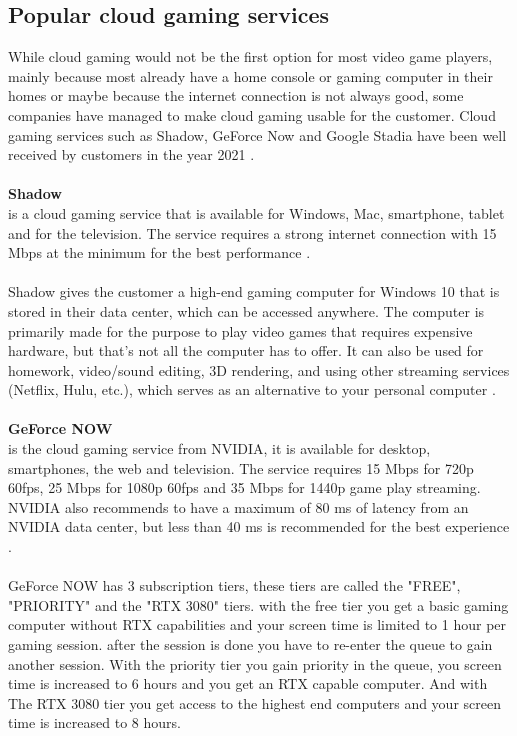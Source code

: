 \subsection{Popular cloud gaming services}
While cloud gaming would not be the first option for most video game players, mainly because most already have a home console or gaming computer in their homes or maybe because the internet connection is not always good, some companies have managed to make cloud gaming usable for the customer. Cloud gaming services such as Shadow, GeForce Now and Google Stadia have been well received by customers in the year 2021 \parencite{topcloud}.\\\\
\textbf{Shadow}\\
 is a cloud gaming service that is available for Windows, Mac, smartphone, tablet and for the television. The service requires a strong internet connection with 15 Mbps at the minimum for the best performance \parencite{shadow}.\\\\
Shadow gives the customer a high-end gaming computer for Windows 10 that is stored in their data center, which can be accessed anywhere. The computer is primarily made for the purpose to play video games that requires expensive hardware, but that's not all the computer has to offer. It can also be used for homework, video/sound editing, 3D rendering, and using other streaming services (Netflix, Hulu, etc.), which serves as an alternative to your personal computer \parencite{shadow}.\\\\
\textbf{GeForce NOW}\\
 is the cloud gaming service from NVIDIA, it is available for desktop, smartphones, the web and television. The service requires 15 Mbps for 720p 60fps, 25 Mbps for 1080p 60fps and 35 Mbps for 1440p game play streaming. NVIDIA also recommends to have a maximum of 80 ms of latency from an NVIDIA data center, but less than 40 ms is recommended for the best experience \parencite{now}.\\\\
GeForce NOW has 3 subscription tiers, these tiers are called the "FREE", "PRIORITY" and the "RTX 3080" tiers. with the free tier you get a basic gaming computer without RTX capabilities and your screen time is limited to 1 hour per gaming session. after the session is done you have to re-enter the queue to gain another session. With the priority tier you gain priority in the queue, you screen time is increased to 6 hours and you get an RTX capable computer. And with The RTX 3080 tier you get access to the highest end computers and your screen time is increased to 8 hours.
